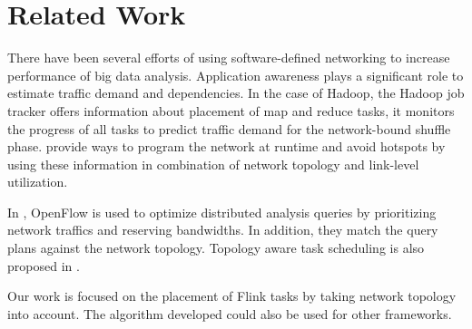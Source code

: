 \section{Related Work}
There have been several efforts of using software-defined networking to increase performance of big
data analysis.  Application awareness plays a significant role to estimate traffic demand and
dependencies. In the case of Hadoop, the Hadoop job tracker offers information about placement of
map and reduce tasks, it monitors the progress of all tasks to predict traffic demand for the
network-bound shuffle phase. \cite{programmingatruntime} \cite {pythia} provide ways to program the
network at runtime and avoid hotspots by using these information in combination of network topology
and link-level utilization.

In \cite{query}, OpenFlow is used to optimize distributed analysis queries by prioritizing network
traffics and reserving bandwidths. In addition, they match the query plans against the network
topology.  Topology aware task scheduling is also proposed in \cite{programmingatruntime}.

Our work is focused on the placement of Flink tasks by taking network topology into account. The
algorithm developed could also be used for other frameworks.

